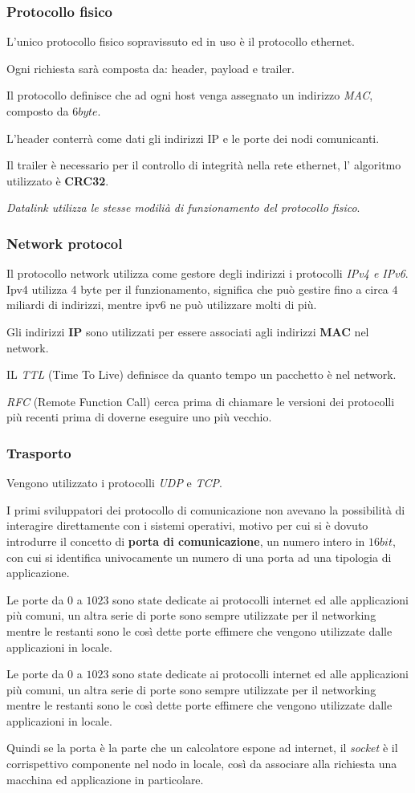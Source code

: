 \subsubsection{Protocollo fisico}
L'unico protocollo fisico sopravissuto ed in uso è il protocollo ethernet.

Ogni richiesta sarà composta da: header, payload e trailer.

Il protocollo definisce che ad ogni host venga assegnato un indirizzo
\emph{MAC}, composto da $6byte$.

L'header conterrà come dati gli indirizzi IP e le porte dei nodi comunicanti.

Il trailer è necessario per il controllo di integrità nella rete ethernet, l'
algoritmo utilizzato è \textbf{CRC32}.

\emph{Datalink utilizza le stesse modilià di funzionamento del protocollo fisico}.

\subsubsection{Network protocol}
Il protocollo network utilizza come gestore degli indirizzi i protocolli
\emph{IPv4 e IPv6}.
Ipv4 utilizza 4 byte per il funzionamento, significa che può gestire fino a 
circa $4$ miliardi di indirizzi, mentre ipv6 ne può utilizzare molti di più.

Gli indirizzi \textbf{IP} sono utilizzati per essere associati agli indirizzi
\textbf{MAC} nel network.

IL \emph{TTL} (Time To Live) definisce da quanto tempo un pacchetto è nel
network.

\emph{RFC} (Remote Function Call) cerca prima di chiamare le versioni dei
protocolli più recenti prima di doverne eseguire uno più vecchio.

\subsubsection{Trasporto}
Vengono utilizzato i protocolli \emph{UDP} e \emph{TCP}.

I primi sviluppatori dei protocollo di comunicazione non avevano la possibilità
di interagire direttamente con i sistemi operativi, motivo per cui si è dovuto
introdurre il concetto di \textbf{porta di comunicazione}, un numero intero
in $16bit$, con cui si identifica univocamente un numero di una porta ad una
tipologia di applicazione.

Le porte da $0$ a $1023$ sono state dedicate ai protocolli internet ed alle
applicazioni più comuni, un altra serie di porte sono sempre utilizzate per
il networking  mentre le restanti sono le così dette porte effimere che vengono
utilizzate dalle applicazioni in locale.

Le porte da $0$ a $1023$ sono state dedicate ai protocolli internet ed alle
applicazioni più comuni, un altra serie di porte sono sempre utilizzate per
il networking  mentre le restanti sono le così dette porte effimere che vengono
utilizzate dalle applicazioni in locale.

Quindi se la porta è la parte che un calcolatore espone ad internet, il
\emph{socket} è il corrispettivo componente nel nodo in locale, così da
associare alla richiesta una macchina ed applicazione in particolare.
